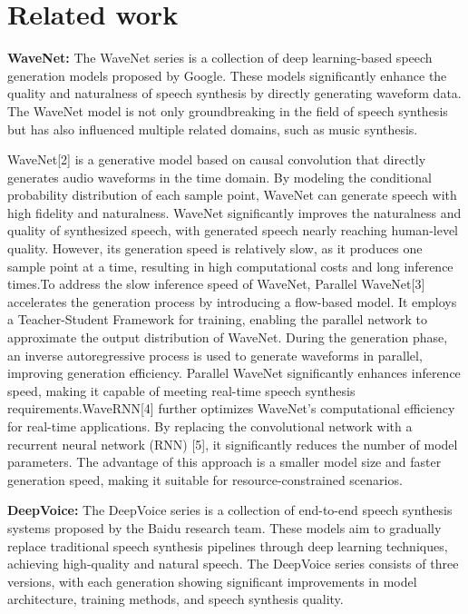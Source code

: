 \section{Related work}
\textbf{WaveNet:} The WaveNet series is a collection of deep learning-based speech generation models proposed by Google. These models significantly enhance the quality and naturalness of speech synthesis by directly generating waveform data. The WaveNet model is not only groundbreaking in the field of speech synthesis but has also influenced multiple related domains, such as music synthesis.
    
    WaveNet[2] is a generative model based on causal convolution that directly generates audio waveforms in the time domain. By modeling the conditional probability distribution of each sample point, WaveNet can generate speech with high fidelity and naturalness. WaveNet significantly improves the naturalness and quality of synthesized speech, with generated speech nearly reaching human-level quality. However, its generation speed is relatively slow, as it produces one sample point at a time, resulting in high computational costs and long inference times.To address the slow inference speed of WaveNet, Parallel WaveNet[3] accelerates the generation process by introducing a flow-based model. It employs a Teacher-Student Framework for training, enabling the parallel network to approximate the output distribution of WaveNet. During the generation phase, an inverse autoregressive process is used to generate waveforms in parallel, improving generation efficiency. Parallel WaveNet significantly enhances inference speed, making it capable of meeting real-time speech synthesis requirements.WaveRNN[4] further optimizes WaveNet’s computational efficiency for real-time applications. By replacing the convolutional network with a recurrent neural network (RNN) [5], it significantly reduces the number of model parameters. The advantage of this approach is a smaller model size and faster generation speed, making it suitable for resource-constrained scenarios.
   
\textbf{DeepVoice:} The DeepVoice series is a collection of end-to-end speech synthesis systems proposed by the Baidu research team. These models aim to gradually replace traditional speech synthesis pipelines through deep learning techniques, achieving high-quality and natural speech. The DeepVoice series consists of three versions, with each generation showing significant improvements in model architecture, training methods, and speech synthesis quality.

